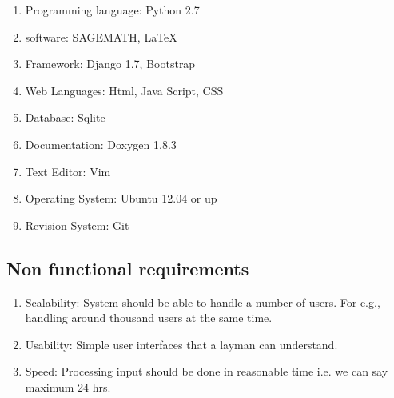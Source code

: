 \begin{itemize}
\begin{enumerate} 
\item Programming language: Python 2.7
\item software: SAGEMATH, \LaTeX{}
\item Framework: Django 1.7, Bootstrap
\item Web Languages: Html, Java Script, CSS
\item Database: Sqlite 
\item Documentation: Doxygen 1.8.3
\item Text Editor: Vim
\item Operating System: Ubuntu 12.04 or up
\item Revision System: Git

\end{enumerate}
\vskip 0.5cm
\subsection{Non functional requirements}
\begin{enumerate} 
\item Scalability: System should be able to handle a number of users. 
For e.g., handling around thousand users at the same time.
\item Usability: Simple user interfaces that a layman can understand.
\item Speed: Processing input should be done in reasonable time
 i.e. we can say maximum 24 hrs.
\end{enumerate}
\end{itemize}
